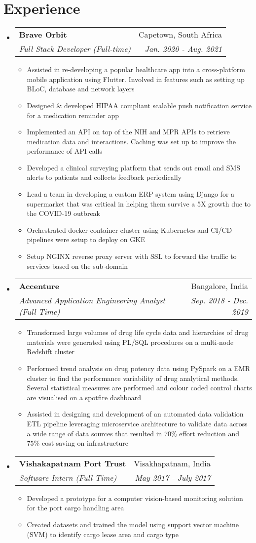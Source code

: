 \documentclass[letterpaper,10pt]{article}
\makeatletter
\newcommand{\resumeItemClean}[1]{
    \item\small{
        {#1 \vspace{-2pt}}
    }
}
\newcommand{\resumeSubheading}[4]{
  \vspace{-1pt}\item
    \begin{tabular*}{0.97\textwidth}[t]{l@{\extracolsep{\fill}}r}
      \textbf{#1} & #2 \\
      \textit{\small#3} & \textit{\small #4} \\
    \end{tabular*}\vspace{-5pt}
}
\newcommand{\resumeSubHeadingListStart}{\begin{itemize}[leftmargin=*]}
\newcommand{\resumeSubHeadingListEnd}{\end{itemize}}
\newcommand{\resumeItemListStart}{\begin{itemize}}
\newcommand{\resumeItemListEnd}{\end{itemize}\vspace{-5pt}}
\makeatother
\begin{document}
\section{Experience}
    \resumeSubHeadingListStart
    \resumeSubheading{Brave Orbit}{Capetown, South Africa}
        {Full Stack Developer (Full-time)}{Jan. 2020 - Aug. 2021}
            \resumeItemListStart
                \resumeItemClean
                    {Assisted in re-developing a popular healthcare app into a cross-platform mobile application using Flutter. Involved in features such as setting up BLoC, database and network layers}
                  \resumeItemClean
                    {Designed \& developed HIPAA compliant scalable push notification service for a medication reminder app}
                  \resumeItemClean
                    {Implemented an API on top of the NIH and MPR APIs to retrieve medication data and interactions. Caching was set up to improve the performance of API calls}
                  \resumeItemClean
                    {Developed a clinical surveying platform that sends out email and SMS alerts to patients and collects feedback periodically}
                  \resumeItemClean
                    {Lead a team in developing a custom ERP system using Django for a supermarket that was critical in helping them survive a 5X growth due to the COVID-19 outbreak}
                  \resumeItemClean
                    {Orchestrated docker container cluster using Kubernetes and CI/CD pipelines were setup to deploy on GKE}
                  \resumeItemClean
                    {Setup NGINX reverse proxy server with SSL to forward the traffic to services based on the sub-domain}
              \resumeItemListEnd
    \resumeSubheading
    	{Accenture}{Bangalore, India}
    	{Advanced Application Engineering Analyst (Full-Time)}{Sep. 2018 -  Dec. 2019}
    	    \resumeItemListStart
                \resumeItemClean
                  {Transformed large volumes of drug life cycle data and hierarchies of drug materials were generated using PL/SQL procedures on a multi-node Redshift cluster}
                \resumeItemClean
                  {Performed trend analysis on drug potency data using PySpark on a EMR cluster to find the performance variability of drug analytical methods. Several statistical measures are performed and colour coded control charts are visualised on a spotfire dashboard}
                \resumeItemClean
                  {Assisted in designing and development of an automated data validation ETL pipeline leveraging microservice architecture to validate data across a wide range of data sources that resulted in 70\% effort reduction and 75\% cost saving on infrastructure}
    	    \resumeItemListEnd
    \resumeSubheading
    	{Vishakapatnam Port Trust}{Visakhapatnam, India}
    	{Software Intern (Full-Time)}{May 2017 -  July 2017}
    	    \resumeItemListStart
            	\resumeItemClean
                  {Developed a prototype for a computer vision-based monitoring solution for the port cargo handling area}
                \resumeItemClean
                  {Created datasets and trained the model using support vector machine (SVM) to identify cargo lease area and cargo type}
    	    \resumeItemListEnd
    \resumeSubHeadingListEnd
\end{document}
